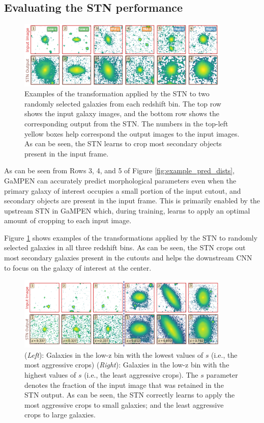 \documentclass[linenumbers,twocolumn,twocolappendix]{aastex631}
\newcommand\gampen{GaMPEN}
\begin{document}
\begin{CJK*}{UTF8}{gbsn}
\subsection{Evaluating the STN performance} \label{sec:stn_performance}

\begin{figure}[htb]
    \centering
    \includegraphics[width = 0.9\textwidth]{stn_random.png}
    \caption{Examples of the transformation applied by the STN to two randomly selected galaxies from each redshift bin. The top row shows the input galaxy images, and the bottom row shows the corresponding output from the STN. The numbers in the top-left yellow boxes help correspond the output images to the input images. As can be seen, the STN learns to crop most secondary objects present in the input frame.}
    \label{fig:stn_random}
\end{figure}

As can be seen from Rows 3, 4, and 5 of Figure \ref{fig:example_pred_dists}, \gampen{} can accurately predict morphological parameters even when the primary galaxy of interest occupies a small portion of the input cutout, and secondary objects are present in the input frame. This is primarily enabled by the upstream STN in \gampen{} which, during training, learns to apply an optimal amount of cropping to each input image. 

Figure \ref{fig:stn_random} shows examples of the transformations applied by the STN to randomly selected galaxies in all three redshift bins. As can be seen, the STN crops out most secondary galaxies present in the cutouts and helps the downstream CNN to focus on the galaxy of interest at the center.

\begin{figure}[htb]
    \centering
    \includegraphics[width = 0.9\textwidth]{stn_min_max.png}
    \caption{(\textit{Left}): Galaxies in the low-z bin  with the lowest values of $s$ (i.e., the most aggressive crops) (\textit{Right}): Galaxies in the low-z bin with the highest values of $s$ (i.e., the least aggressive crops). The $s$ parameter denotes the fraction of the input image that was retained in the STN output. As can be seen, the STN correctly learns to apply the most aggressive crops to small galaxies; and the least aggressive crops to large galaxies.}
    \label{fig:stn_min_max}
\end{figure}


\end{CJK*}
\end{document}
